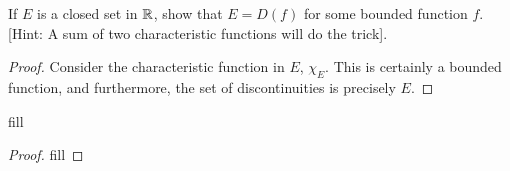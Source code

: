 \begin{exercise}{9}
If $E$ is a closed set in $\mathbb{R}$, show that $E=D(f)$ for some bounded function $f$.
[Hint: A sum of two characteristic functions will do the trick].
\end{exercise}
\begin{proof}
Consider the characteristic function in $E$, $\chi_E$.
This is certainly a bounded function, and furthermore, the set of discontinuities is precisely $E$.
\end{proof} 

\begin{exercise}{12}
fill
\end{exercise}
\begin{proof}
fill
\end{proof} 
